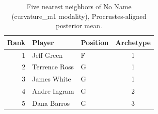 \begin{table}[htbp]
  \centering\small
  \begin{tabular}{rllc}
    \toprule
    Rank & Player & Position & Archetype \\
    \midrule
    1 & Jeff Green & F & 1 \\
    2 & Terrence Ross & G & 1 \\
    3 & James White & G & 1 \\
    4 & Andre Ingram & G & 2 \\
    5 & Dana Barros & G & 3 \\
    \bottomrule
  \end{tabular}
  \caption{Five nearest neighbors of No Name (curvature_m1 modality), Procrustes-aligned posterior mean.}
  \label{tab:No_Name_neighbors_curvature_m1}
\end{table}

